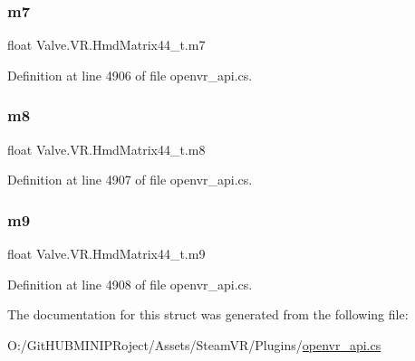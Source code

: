 \subsubsection{\texorpdfstring{m7}{m7}}
{\footnotesize\ttfamily float Valve.\+V\+R.\+Hmd\+Matrix44\+\_\+t.\+m7}



Definition at line 4906 of file openvr\+\_\+api.\+cs.

\mbox{\label{struct_valve_1_1_v_r_1_1_hmd_matrix44__t_a511aa10c352b4ea8ef75052d9dfbb7d1}} 
\subsubsection{\texorpdfstring{m8}{m8}}
{\footnotesize\ttfamily float Valve.\+V\+R.\+Hmd\+Matrix44\+\_\+t.\+m8}



Definition at line 4907 of file openvr\+\_\+api.\+cs.

\mbox{\label{struct_valve_1_1_v_r_1_1_hmd_matrix44__t_a933f53f7b2c1e6db489605c6ac024e58}} 
\subsubsection{\texorpdfstring{m9}{m9}}
{\footnotesize\ttfamily float Valve.\+V\+R.\+Hmd\+Matrix44\+\_\+t.\+m9}



Definition at line 4908 of file openvr\+\_\+api.\+cs.



The documentation for this struct was generated from the following file\+:\begin{DoxyCompactItemize}
\item 
O\+:/\+Git\+H\+U\+B\+M\+I\+N\+I\+P\+Roject/\+Assets/\+Steam\+V\+R/\+Plugins/\mbox{\hyperlink{openvr__api_8cs}{openvr\+\_\+api.\+cs}}\end{DoxyCompactItemize}
